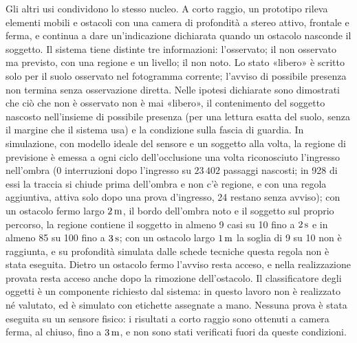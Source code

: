 Gli altri usi condividono lo stesso nucleo. A corto raggio, un prototipo rileva elementi mobili e ostacoli con una camera di profondità a stereo attivo, frontale e ferma, e continua a dare un'indicazione dichiarata quando un ostacolo nasconde il soggetto. Il sistema tiene distinte tre informazioni: l'osservato; il non osservato ma previsto, con una regione e un livello; il non noto. Lo stato «libero» è scritto solo per il suolo osservato nel fotogramma corrente; l'avviso di possibile presenza non termina senza osservazione diretta. Nelle ipotesi dichiarate sono dimostrati che ciò che non è osservato non è mai «libero», il contenimento del soggetto nascosto nell'insieme di possibile presenza (per una lettura esatta del suolo, senza il margine che il sistema usa) e la condizione sulla fascia di guardia. In simulazione, con modello ideale del sensore e un soggetto alla volta, la regione di previsione è emessa a ogni ciclo dell'occlusione una volta riconosciuto l'ingresso nell'ombra (0 interruzioni dopo l'ingresso su $23\,402$ passaggi nascosti; in 928 di essi la traccia si chiude prima dell'ombra e non c'è regione, e con una regola aggiuntiva, attiva solo dopo una prova d'ingresso, 24 restano senza avviso); con un ostacolo fermo largo $2\,\mathrm{m}$, il bordo dell'ombra noto e il soggetto sul proprio percorso, la regione contiene il soggetto in almeno 9 casi su 10 fino a $2\,\mathrm{s}$ e in almeno 85 su 100 fino a $3\,\mathrm{s}$; con un ostacolo largo $1\,\mathrm{m}$ la soglia di 9 su 10 non è raggiunta, e su profondità simulata dalle schede tecniche questa regola non è stata eseguita. Dietro un ostacolo fermo l'avviso resta acceso, e nella realizzazione provata resta acceso anche dopo la rimozione dell'ostacolo. Il classificatore degli oggetti è un componente richiesto dal sistema: in questo lavoro non è realizzato né valutato, ed è simulato con etichette assegnate a mano. Nessuna prova è stata eseguita su un sensore fisico: i risultati a corto raggio sono ottenuti a camera ferma, al chiuso, fino a $3\,\mathrm{m}$, e non sono stati verificati fuori da queste condizioni.

